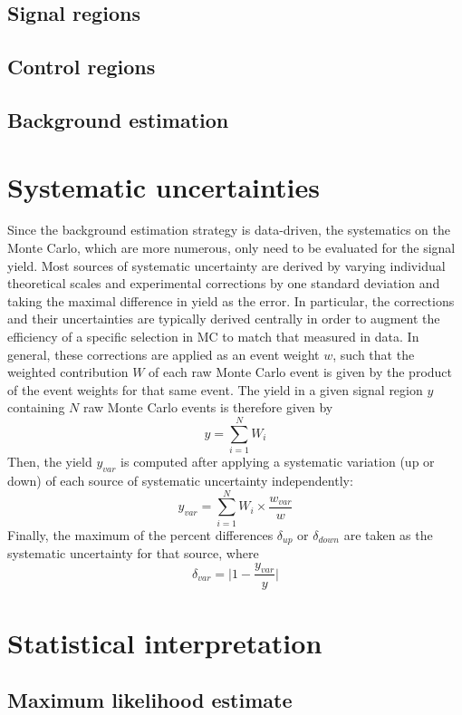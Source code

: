 \subsection{Signal regions}
\subsection{Control regions}
\subsection{Background estimation}

\section{Systematic uncertainties}
Since the background estimation strategy is data-driven, the systematics on the Monte Carlo, which are more numerous, only need to be evaluated for the signal yield. 
Most sources of systematic uncertainty are derived by varying individual theoretical scales and experimental corrections by one standard deviation and taking the maximal difference in yield as the error. 
In particular, the corrections and their uncertainties are typically derived centrally in order to augment the efficiency of a specific selection in MC to match that measured in data.
In general, these corrections are applied as an event weight $w$, such that the weighted contribution $W$ of each raw Monte Carlo event is given by the product of the event weights for that same event. 
The yield in a given signal region $y$ containing $N$ raw Monte Carlo events is therefore given by
\begin{equation}
    y = \sum_{i = 1}^{N}W_i
\end{equation}
Then, the yield $y_{var}$ is computed after applying a systematic variation (up or down) of each source of systematic uncertainty independently:
\begin{equation}\label{eq:systs}
    y_{var} = \sum_{i = 1}^{N}W_i\times\frac{w_{var}}{w}
\end{equation}
Finally, the maximum of the percent differences $\delta_{up}$ or $\delta_{down}$ are taken as the systematic uncertainty for that source, where
\begin{equation}
    \delta_{var} = \bigg| 1-\frac{y_{var}}{y} \bigg|
\end{equation}

\section{Statistical interpretation}
\subsection{Maximum likelihood estimate}
